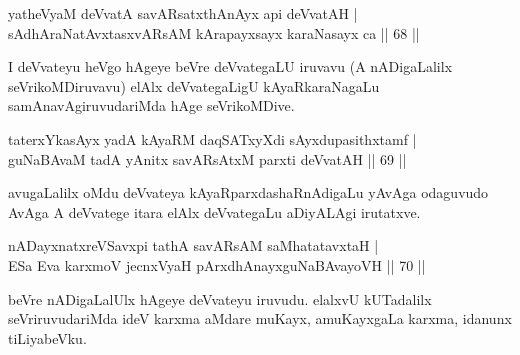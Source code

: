 \begin{shl}
\footnotemark[2]yatheVyaM \footnotemark[3]deVvatA savARsatxthA\s nAyx api deVvatAH |\\
sAdhAraNatAvxtasxvARsAM kArapayxsayx karaNasayx ca \hfill || 68 || 
\end{shl}

\begin{artha}
 I deVvateyu heVgo hAgeye beVre deVvategaLU iruvavu (A nADigaLalilx seVrikoMDiruvavu) elAlx deVvategaLigU kAyaRkaraNagaLu samAnavAgiruvudariMda hAge seVrikoMDive.
\end{artha}

\begin{shl}
taterxYkasAyx yadA kAyaRM daqSATxyXdi sAyxdupasithxtamf |\\
guNaBAvaM tadA yAnitx savARsAtxM parxti deVvatAH \hfill || 69 || 
\end{shl}

\begin{artha}
avugaLalilx oMdu deVvateya kAyaRparxdashaRnAdigaLu yAvAga odaguvudo AvAga A deVvatege itara elAlx deVvategaLu aDiyALAgi irutatxve.
\end{artha}

\begin{shl}
\footnotemark[1]nADayxnatxreVSavxpi \footnotemark[2]tathA savARsAM saMhatatavxtaH |\\
ESa Eva karxmoV jecnxVyaH pArxdhAnayxguNaBAvayoVH \hfill || 70 || 
\end{shl}

\begin{artha}
 beVre nADigaLalUlx hAgeye deVvateyu iruvudu. elalxvU kUTadalilx seVriruvudariMda ideV karxma aMdare muKayx, amuKayxgaLa karxma, idanunx tiLiyabeVku.
\end{artha}

